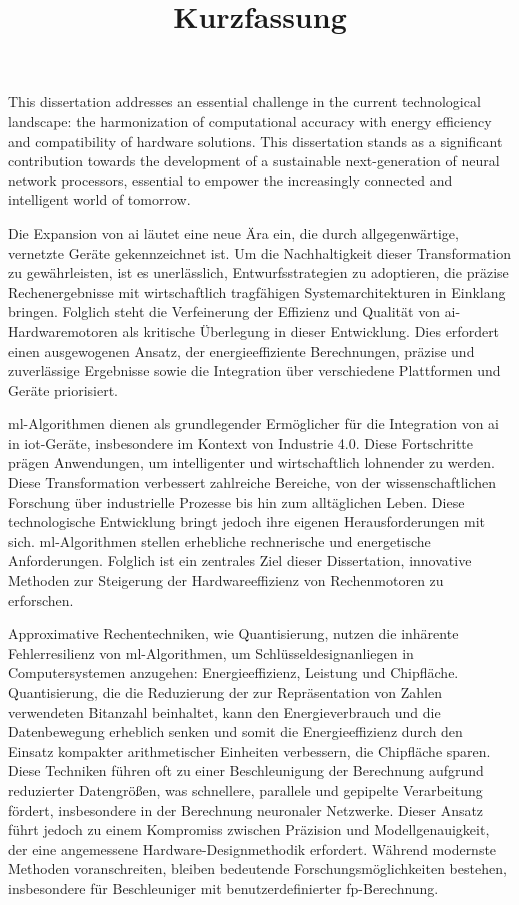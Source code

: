 \documentclass{article}
\begin{document}
This dissertation addresses an essential challenge in the current technological landscape: the harmonization of computational accuracy with energy efficiency and compatibility of hardware solutions. This dissertation stands as a significant contribution towards the development of a sustainable next-generation of neural network processors, essential to empower the increasingly connected and intelligent world of tomorrow.

\newpage
\title{\textbf{Kurzfassung}}

\thispagestyle{empty}

Die Expansion von \gls{ai} l\"autet eine neue \"Ara ein, die durch allgegenw\"artige, vernetzte Ger\"ate gekennzeichnet ist. Um die Nachhaltigkeit dieser Transformation zu gew\"ahrleisten, ist es unerl\"asslich, Entwurfsstrategien zu adoptieren, die pr\"azise Rechenergebnisse mit wirtschaftlich tragf\"ahigen Systemarchitekturen in Einklang bringen. Folglich steht die Verfeinerung der Effizienz und Qualit\"at von \gls{ai}-Hardwaremotoren als kritische \"Uberlegung in dieser Entwicklung. Dies erfordert einen ausgewogenen Ansatz, der energieeffiziente Berechnungen, pr\"azise und zuverl\"assige Ergebnisse sowie die Integration \"uber verschiedene Plattformen und Ger\"ate priorisiert.

\gls{ml}-Algorithmen dienen als grundlegender Erm\"oglicher f\"ur die Integration von \gls{ai} in \gls{iot}-Ger\"ate, insbesondere im Kontext von Industrie 4.0. Diese Fortschritte pr\"agen Anwendungen, um intelligenter und wirtschaftlich lohnender zu werden. Diese Transformation verbessert zahlreiche Bereiche, von der wissenschaftlichen Forschung \"uber industrielle Prozesse bis hin zum allt\"aglichen Leben. Diese technologische Entwicklung bringt jedoch ihre eigenen Herausforderungen mit sich. \gls{ml}-Algorithmen stellen erhebliche rechnerische und energetische Anforderungen. Folglich ist ein zentrales Ziel dieser Dissertation, innovative Methoden zur Steigerung der Hardwareeffizienz von Rechenmotoren zu erforschen.

Approximative Rechentechniken, wie Quantisierung, nutzen die inh\"arente Fehlerresilienz von \gls{ml}-Algorithmen, um Schl\"usseldesignanliegen in Computersystemen anzugehen: Energieeffizienz, Leistung und Chipfl\"ache. Quantisierung, die die Reduzierung der zur Repr\"asentation von Zahlen verwendeten Bitanzahl beinhaltet, kann den Energieverbrauch und die Datenbewegung erheblich senken und somit die Energieeffizienz durch den Einsatz kompakter arithmetischer Einheiten verbessern, die Chipfl\"ache sparen. Diese Techniken f\"uhren oft zu einer Beschleunigung der Berechnung aufgrund reduzierter Datengr\"o\ss{}en, was schnellere, parallele und gepipelte Verarbeitung f\"ordert, insbesondere in der Berechnung neuronaler Netzwerke. Dieser Ansatz f\"uhrt jedoch zu einem Kompromiss zwischen Pr\"azision und Modellgenauigkeit, der eine angemessene Hardware-Designmethodik erfordert. W\"ahrend modernste Methoden voranschreiten, bleiben bedeutende Forschungsm\"oglichkeiten bestehen, insbesondere f\"ur Beschleuniger mit benutzerdefinierter \gls{fp}-Berechnung.
\end{document}
